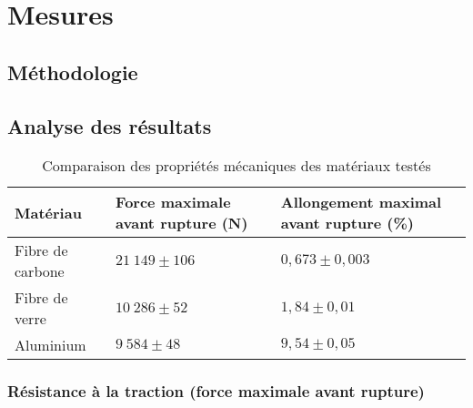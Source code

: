 

\chapter{Mesures}


\section{Méthodologie}


\section{Analyse des résultats}


\begin{table}[h!]
    \centering
    \label{tab:comparaison_materiaux}
    \renewcommand{\arraystretch}{1.5}
    \begin{tabular}{|p{4cm}|p{4cm}|p{4cm}|}
        \hline
        \textbf{Matériau} & \textbf{Force maximale avant rupture (N)} & \textbf{Allongement maximal avant rupture (\%)} \\ \hline
        Fibre de carbone  & $21\ 149 \pm 106$                         & $0,673 \pm 0,003$                               \\ \hline
        Fibre de verre    & $10\ 286 \pm 52$                          & $1,84 \pm 0,01$                                 \\ \hline
        Aluminium         & $9\ 584 \pm 48$                           & $9,54 \pm 0,05$                                 \\ \hline
    \end{tabular}
    \caption{Comparaison des propriétés mécaniques des matériaux testés}
\end{table}

\begin{figure}[!htb]
    \centering
    
\end{figure}
\begin{figure}[!htb]
    \centering
    
\end{figure}
\begin{figure}[!htb]
    \centering
    
\end{figure}

\subsection{Résistance à la traction (force maximale avant rupture)}

